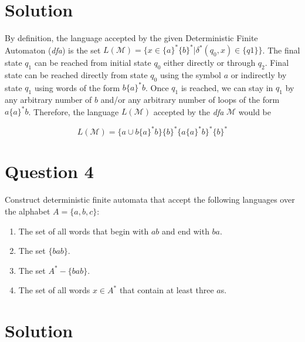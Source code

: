 \section*{Solution}

By definition, the language accepted by the given Deterministic Finite Automaton (\textit{dfa}) is the set $ L \left( \mathcal{M} \right) = \{ x \in \{a\}^*\{b\}^* | \delta ^* \left( q_0,x \right) \in \{q1\} \}$.
The final state $q_1$ can be reached from initial state $q_0$ either directly or through $q_2$.
Final state can be reached directly from state $q_0$ using the symbol $a$ or indirectly by state $q_1$ using words of the form $b\{a\}^*b$.
Once $q_1$ is reached, we can stay in $q_1$ by any arbitrary number of $b$ and/or any arbitrary number of loops of the form $a\{a\}^*b$.
Therefore, the language $L(\mathcal{M})$ accepted by the \textit{dfa} $\mathcal{M}$ would be

\begin{equation}
	L(\mathcal{M}) = \{a \cup b\{a\}^*b\}\{b\}^*\{a\{a\}^*b\}^*\{b\}^*
\end{equation}

\section*{Question 4}

Construct deterministic finite automata that accept the following languages over the alphabet $A = \{a,b,c\}$:
\begin{enumerate}[label=(\alph*)]
	\item The set of all words that begin with $ab$ and end with $ba$.
	\item The set $\{bab\}$.
	\item The set $A^* - \{bab\}$.
	\item The set of all words $x \in A^*$ that contain at least three $a$s.
\end{enumerate}

\section*{Solution}

